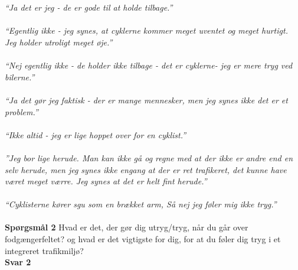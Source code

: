 \\\\
  \emph{“Ja det er jeg - de er gode til at holde tilbage.”}
\\\\
  \emph{“Egentlig ikke - jeg synes, at cyklerne kommer meget uventet og meget hurtigt. Jeg holder utroligt meget øje.”}
\\\\
\emph{“Nej egentlig ikke - de holder ikke tilbage - det er cyklerne- jeg er mere tryg ved bilerne.”}
\\\\
\emph{“Ja det gør jeg faktisk - der er mange mennesker, men jeg synes ikke det er et problem.”
\\\\
  “Ikke altid - jeg er lige hoppet over for en cyklist.”
\\\\
  ”Jeg bor lige herude. Man kan ikke gå og regne med at der ikke er andre end en selv herude, men jeg synes ikke engang at der er ret trafikeret, det kunne have været meget værre. Jeg synes at det er helt fint herude.”
\\\\
  “Cyklisterne kører sgu som en brækket arm, Så nej jeg føler mig ikke tryg.”}
\\\\
  \textbf{Spørgsmål 2}
  Hvad er det, der gør dig utryg/tryg, når du går over fodgængerfeltet? og hvad er det vigtigste for dig, for at du føler dig tryg i et integreret trafikmiljø?
  \\
  \textbf{Svar 2}
